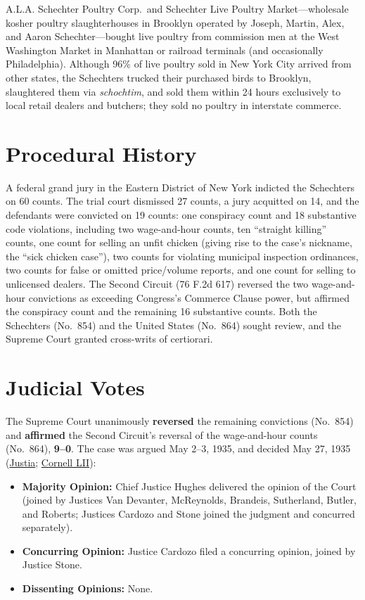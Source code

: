 \documentclass[12pt]{article}
\begin{document}
A.L.A. Schechter Poultry Corp.\ and Schechter Live Poultry Market---wholesale kosher poultry slaughterhouses in Brooklyn operated by Joseph, Martin, Alex, and Aaron Schechter---bought live poultry from commission men at the West Washington Market in Manhattan or railroad terminals (and occasionally Philadelphia). Although 96\% of live poultry sold in New York City arrived from other states, the Schechters trucked their purchased birds to Brooklyn, slaughtered them via \textit{schochtim}, and sold them within 24 hours exclusively to local retail dealers and butchers; they sold no poultry in interstate commerce.

\section{Procedural History}
A federal grand jury in the Eastern District of New York indicted the Schechters on 60 counts. The trial court dismissed 27 counts, a jury acquitted on 14, and the defendants were convicted on 19 counts: one conspiracy count and 18 substantive code violations, including two wage-and-hour counts, ten ``straight killing'' counts, one count for selling an unfit chicken (giving rise to the case's nickname, the ``sick chicken case''), two counts for violating municipal inspection ordinances, two counts for false or omitted price/volume reports, and one count for selling to unlicensed dealers. The Second Circuit (76 F.2d 617) reversed the two wage-and-hour convictions as exceeding Congress's Commerce Clause power, but affirmed the conspiracy count and the remaining 16 substantive counts. Both the Schechters (No.\ 854) and the United States (No.\ 864) sought review, and the Supreme Court granted cross-writs of certiorari.

\section{Judicial Votes}
The Supreme Court unanimously \textbf{reversed} the remaining convictions (No.\ 854) and \textbf{affirmed} the Second Circuit's reversal of the wage-and-hour counts (No.\ 864), \textbf{9--0}. The case was argued May 2--3, 1935, and decided May 27, 1935 (\href{https://supreme.justia.com/cases/federal/us/295/495/}{Justia}; \href{https://www.law.cornell.edu/supremecourt/text/295/495}{Cornell LII}):

\begin{itemize}

\item \textbf{Majority Opinion:} Chief Justice Hughes delivered the opinion of the Court (joined by Justices Van Devanter, McReynolds, Brandeis, Sutherland, Butler, and Roberts; Justices Cardozo and Stone joined the judgment and concurred separately).

\item \textbf{Concurring Opinion:} Justice Cardozo filed a concurring opinion, joined by Justice Stone.
    \item \textbf{Dissenting Opinions:} None.
\end{itemize}
\end{document}
